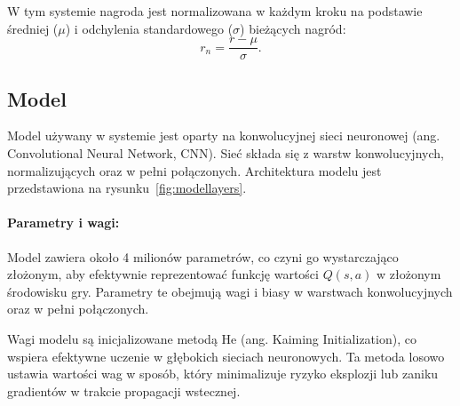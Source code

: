 W tym systemie nagroda jest normalizowana w każdym kroku na podstawie średniej (\(\mu\)) i odchylenia standardowego (\(\sigma\)) bieżących nagród:
\begin{equation}r_n = \frac{r - \mu}{\sigma}.\end{equation}
\subsection{Model}

Model używany w systemie jest oparty na konwolucyjnej sieci neuronowej (ang. Convolutional Neural Network, CNN). Sieć składa się z warstw konwolucyjnych, normalizujących oraz w pełni połączonych. Architektura modelu jest przedstawiona na rysunku~\ref{fig:modellayers}.

\paragraph{Parametry i wagi:}
Model zawiera około 4 milionów parametrów, co czyni go wystarczająco złożonym, aby efektywnie reprezentować funkcję wartości \(Q(s, a)\) w złożonym środowisku gry. Parametry te obejmują wagi i biasy w warstwach konwolucyjnych oraz w pełni połączonych.

Wagi modelu są inicjalizowane metodą He\cite{he2015} (ang. Kaiming Initialization), co wspiera efektywne uczenie w głębokich sieciach neuronowych. Ta metoda losowo ustawia wartości wag w sposób, który minimalizuje ryzyko eksplozji lub zaniku gradientów w trakcie propagacji wstecznej.

